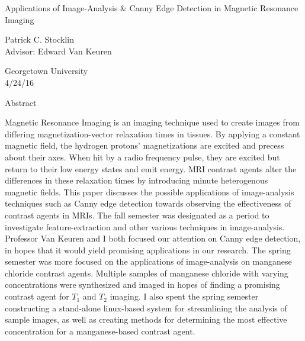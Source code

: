 \documentclass[a4paper,12pt]{article}
\begin{document}
	\begin{center}
	\vspace{0.5cm}
	\huge{Applications of Image-Analysis \& Canny Edge Detection in Magnetic Resonance Imaging}\\
	\vspace{0.5cm}

	\singlespacing
	\small{Patrick C. Stocklin}\\

	\small{Advisor: Edward Van Keuren}

	\small{Georgetown University}\\

	\small{4/24/16}\\
	\end{center}

\begin{section}{Abstract}
\singlespacing

Magnetic Resonance Imaging is an imaging technique used to create images from differing magnetization-vector relaxation times in tissues. By applying a constant magnetic field, the hydrogen protons' magnetizations are excited and precess about their axes. When hit by a radio frequency pulse, they are excited but return to their low energy states and emit energy. MRI contrast agents alter the differences in these relaxation times by introducing minute heterogenous magnetic fields. This paper discusses the possible applications of image-analysis techniques such as Canny edge detection towards observing the effectiveness of contrast agents in MRIs. The fall semester was designated as a period to investigate feature-extraction and other various techniques in image-analysis. Professor Van Keuren and I both focused our attention on Canny edge detection, in hopes that it would yield promising applications in our research. The spring semester was more focused on the applications of image-analysis on manganese chloride contrast agents. Multiple samples of manganese chloride with varying concentrations were synthesized and imaged in hopes of finding a promising contrast agent for $T_1$ and $T_2$ imaging. I also spent the spring semester constructing a stand-alone linux-based system for streamlining the analysis of sample images, as well as creating methods for determining the most effective concentration for a manganese-based contrast agent.


\end{section}

\newpage
\doublespacing
\end{document}
